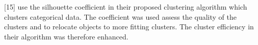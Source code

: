 



\textcite{silhouetteRelocatingMeasure}[15] use the silhouette coefficient in their proposed clustering algorithm which clusters categorical data. The coefficient was used assess the quality of the clusters and to relocate objects to more fitting clusters. The cluster efficiency in their algorithm was therefore enhanced.
